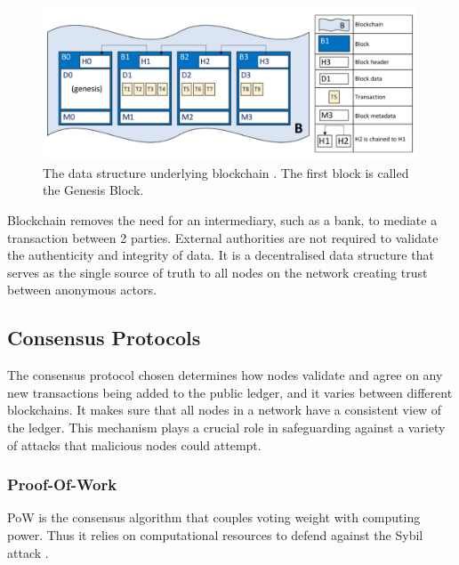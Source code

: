 \begin{figure}[h]
    \centering
    \includegraphics[width=13cm,center]{Figures/BlockchainStructure.png}
    \caption{The data structure underlying blockchain \cite{ADocumentation}. The first block is called the Genesis Block.}
    \label{Figure:BasicBlockchain}
\end{figure}

Blockchain removes the need for an intermediary, such as a bank, to mediate a transaction between 2 parties. External authorities are not required to validate the authenticity and integrity of data. It is a decentralised data structure that serves as the single source of truth to all nodes on the network creating trust between anonymous actors.




\subsection{Consensus Protocols}

The consensus protocol chosen determines how nodes validate and agree on any new transactions being added to the public ledger, and it varies between different blockchains. It makes sure that all nodes in a network have a consistent view of the ledger. This mechanism plays a crucial role in safeguarding against a variety of attacks that malicious nodes could attempt.

\subsubsection{Proof-Of-Work}

PoW is the consensus algorithm that couples voting weight with computing 
power. Thus it relies on computational resources to defend against the Sybil attack \cite{Sedlmeir2020TheMyth}.

